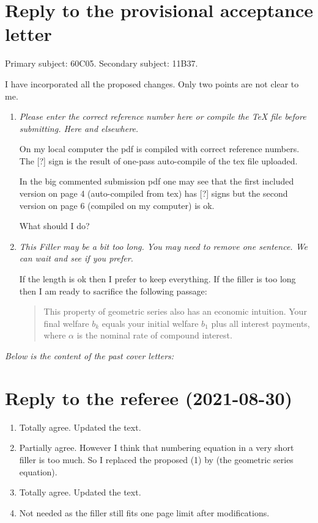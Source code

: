 \documentclass[12pt]{article}
\begin{document}
\section*{Reply to the provisional acceptance letter}

Primary subject: 60C05. Secondary subject: 11B37.

I have incorporated all the proposed changes. Only two points are not clear to me. 

\begin{enumerate}
  \item \textit{Please enter the correct reference number here or compile the 
  TeX file before submitting. Here and elsewhere.}

  On my local computer the pdf is compiled with correct reference numbers.
  The [?] sign is the result of one-pass auto-compile of the tex file uploaded. 
  
  In the big commented submission pdf one may see that the first included version on page 4 (auto-compiled from tex) has [?] 
  signs but the second version on page 6 (compiled on my computer) is ok.
  
  What should I do?

  \item \textit{This Filler may be a bit too long. 
  You may need to remove one sentence. We can wait and see if you prefer.}

  If the length is ok then I prefer to keep everything. If the filler is too long 
  then I am ready to sacrifice the following passage:

\begin{quote}
  This property of geometric series also has an economic intuition. 
Your final welfare $b_k$ equals your initial welfare $b_1$ plus all interest payments,
where $\alpha$ is the nominal rate of compound interest.
\end{quote}

\end{enumerate}



\textit{Below is the content of the past cover letters:}


\section*{Reply to the referee (2021-08-30)}

\begin{enumerate}
  \item Totally agree. Updated the text.
  \item Partially agree. However I think that numbering equation in a very short filler is too much.
  So I replaced the proposed (1) by (the geometric series equation).
  \item Totally agree. Updated the text.
  \item Not needed as the filler still fits one page limit after modifications.
\end{enumerate}
\end{document}

